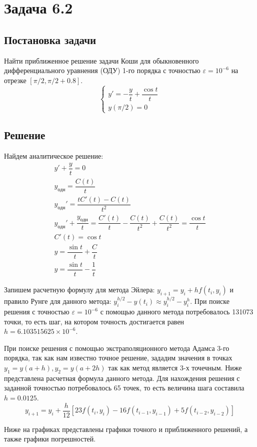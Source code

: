 \section*{Задача 6.2}
\subsection*{Постановка задачи}
Найти приближенное решение задачи Коши для обыкновенного дифференциального уравнения (ОДУ) 1-го порядка с точностью $\varepsilon = 10^{-6}$ на отрезке $[\pi/2, \pi/2 + 0.8]$.
\[
	\begin{cases}
		y' = -\dfrac{y}{t} + \dfrac{\cos{t}}{t} \\
		y(\pi/2) = 0
	\end{cases}
\]
\subsection*{Решение}
Найдем аналитическое решение:
\begin{gather*}
	y' + \dfrac{y}{t} = 0 \\
	y_{одн} = \dfrac{C(t)}{t}\\
	y_{одн}' = \dfrac{tC'(t) - C(t)}{t^2}\\
	y_{одн}' + \dfrac{y_{одн}}{t} = \dfrac{C'(t)}{t} - \dfrac{C(t)}{t^2} + \dfrac{C(t)}{t^2} = \dfrac{\cos{t}}{t} \\
	C'(t) = \cos{t} \\
	y = \dfrac{\sin{t}}{t} + \dfrac{C}{t}\\
	y = \dfrac{\sin{t}}{t} - \dfrac{1}{t}
\end{gather*}

Запишем расчетную формулу для метода Эйлера: $y_{i+1} = y_i + hf(t_i, y_i)$ и правило Рунге для данного метода: $y^{h/2}_i - y(t_i) \approx y^{h/2}_i - y^{h}_i$. При поиске решения с точностью $\varepsilon = 10^{-6}$ с помощью данного метода потребовалось 131073 точки, то есть шаг, на котором точность достигается равен $h = 6.103515625 \times 10^{-6}$.

При поиске решения с помощью экстраполяционного метода Адамса 3-го порядка, так как нам известно точное решение, зададим значения в точках $y_1 = y(a + h), y_2 = y(a + 2h)$ так как метод является 3-х точечным. Ниже представлена  расчетная формула данного метода. Для нахождения решения с заданной точностью потребовалось 65 точек, то есть величина шага составила $h = 0.0125$.
\[
	y_{i+1} = y_i + \dfrac{h}{12}[23f(t_i, y_i) - 16f(t_{i-1}, y_{i-1}) + 5f(t_{i-2}, y_{i-2})]
\]

Ниже на графиках представлены графики точного и приближенного решений, а также графики погрешностей.

